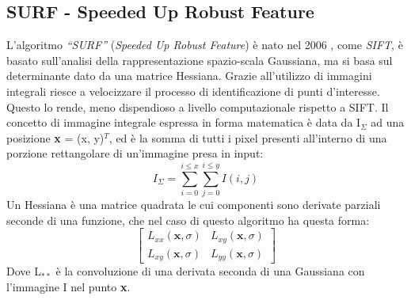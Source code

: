 \subsection{SURF - Speeded Up Robust Feature}
L'algoritmo \textit{``SURF''} (\textit{Speeded Up Robust Feature}) è nato nel 2006 \cite{BAY2008346}, come \textit{SIFT}, è basato sull'analisi della rappresentazione spazio-scala Gaussiana, ma si basa sul determinante dato da una matrice Hessiana. Grazie all'utilizzo di immagini integrali riesce a velocizzare il processo di identificazione di punti d'interesse. Questo lo rende, meno dispendioso a livello computazionale rispetto a SIFT.\hfill \break
\noindent Il concetto di immagine integrale espressa in forma matematica è data da I\(_{\Sigma}\) ad una posizione \textbf{x} = (x, y)\(^{T}\), ed è la somma di tutti i pixel presenti all'interno di una porzione rettangolare di un'immagine presa in input:
\begin{equation}
	I_{\Sigma} = \sum^{i \leq x}_{i=0} \sum^{i \leq y}_{j=0} I (i, j)
\end{equation}
\noindent Un Hessiana è una matrice quadrata le cui componenti sono derivate parziali seconde di una funzione, che nel caso di questo algoritmo ha questa forma:
\begin{equation}
	\begin{bmatrix}
		L_{xx}(\textbf{x}, \sigma) & L_{xy}(\textbf{x}, \sigma) \\
		L_{xy}(\textbf{x}, \sigma) & L_{yy}(\textbf{x}, \sigma)
	\end{bmatrix}
\end{equation}
\noindent Dove L\(_{**}\) è la convoluzione di una derivata seconda di una Gaussiana con l'immagine I nel punto \textbf{x}.
